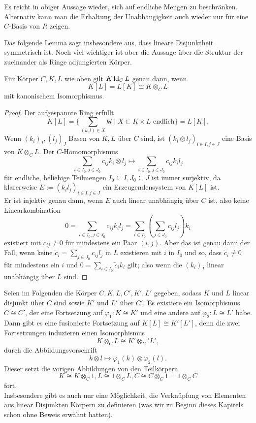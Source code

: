     \begin{remark}
    	Es reicht in obiger Aussage wieder, sich auf endliche Mengen zu beschränken. Alternativ kann man die Erhaltung der Unabhängigkeit auch wieder nur für eine $C$-Basis von $R$ zeigen.
    \end{remark}
    
    Das folgende Lemma sagt insbesondere aus, dass lineare Disjunktheit symmetrisch ist. Noch viel wichtiger ist aber die Aussage über die Struktur der zueinander als Ringe adjungierten Körper.
    \newpage
    \begin{lemma}\label{Tensoren}
    	Für Körper $C,K,L$ wie oben gilt $K\operatorname{ld}_CL$ genau dann, wenn $$K[L]=L[K]\cong K\otimes_CL$$ mit kanonischem Isomorphismus.
    \end{lemma}
    \begin{proof}
    	Der aufgespannte Ring erfüllt $$K[L]=\{\sum\limits_{(k,l)\in X}kl\mid X\subset K\times L\text{ endlich}\}=L[K].$$
    	Wenn $(k_i)_I,(l_j)_J$ Basen von $K,L$ über $C$ sind, ist $(k_i\otimes l_j)_{i\in I,j\in J}$ eine Basis von $K\otimes_CL$. Der $C$-Homomorphismus $$\sum\limits_{i\in I_0,j\in J_0} c_{ij}k_i\otimes l_j\mapsto \sum\limits_{i\in I_0,j\in J_0} c_{ij}k_il_j$$ für endliche, beliebige Teilmengen $I_0\subseteq I,J_0\subseteq J$ ist immer surjektiv, da klarerweise $E:=(k_il_j)_{i\in I,j\in J}$ ein Erzeugendensystem von $K[L]$ ist.\\
    	Er ist injektiv genau dann, wenn $E$ auch linear unabhängig über $C$ ist, also keine Linearkombination $$0=\sum\limits_{i\in I_0,j\in J_0}c_{ij}k_il_j=\sum\limits_{i\in I_0}(\sum\limits_{j\in J_0}c_{ij}l_j)k_i$$ existiert mit $c_{ij}\neq0$ für mindestens ein Paar $(i,j)$. Aber das ist genau dann der Fall, wenn keine $\tilde{c}_i=\sum\limits_{j\in J_0}c_{ij}l_j$ in $L$ existieren mit $i$ in $I_0$ und so, dass $\tilde{c}_i\neq0$ für mindestens ein $i$ und $0=\sum\limits_{i\in I_0}\tilde{c}_ik_i$ gilt; also wenn die $(k_i)_I$ linear unabhängig über $L$ sind.
    \end{proof}
    
    \begin{corollary}\label{Isomorphismen linear disjunkt}
    	Seien im Folgenden die Körper $C,K,L,C',K',L'$ gegeben, sodass $K$ und $L$ linear disjunkt über $C$ sind sowie $K'$ und $L'$ über $C'$. Es existiere ein Isomorphismus $C\cong C'$, der eine Fortsetzung auf $\varphi_1:K\cong K'$ und eine andere auf $\varphi_2:L\cong L'$ habe. Dann gibt es eine \glqq{}fusionierte\grqq{} Fortsetzung auf $K[L]\cong K'[L']$, denn die zwei Fortsetzungen induzieren einen Isomorphismus $$K\otimes_CL\cong K'\otimes_C'L',$$ durch die Abbildungsvorschrift $$k\otimes l\mapsto\varphi_1(k)\otimes\varphi_2(l).$$\newpage
    	Dieser setzt die vorigen Abbildungen von den Teilkörpern $$K\cong K\otimes_C1,L\cong1\otimes_CL,C\cong C\otimes_C1=1\otimes_CC$$ fort.\\
    	Insbesondere gibt es auch nur eine Möglichkeit, die Verknüpfung von Elementen aus linear Disjunkten Körpern zu definieren (was wir zu Beginn dieses Kapitels schon ohne Beweis erwähnt hatten).
    \end{corollary}
    
